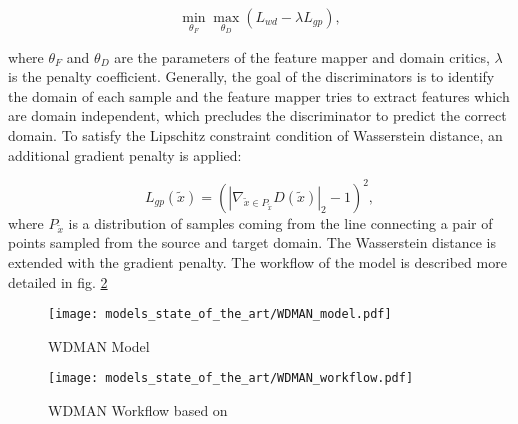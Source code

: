 \begin{equation}
    \min_{\theta_{F}} \max_{\theta_{D}} (L_{wd} - \lambda L_{gp}), 
\end{equation}

where $\theta_{F}$ and $\theta_{D}$ are the parameters of the feature mapper and domain critics, $\lambda$ is the penalty coefficient. Generally, the goal of the discriminators is to identify the domain of each sample and the feature mapper tries to extract features which are domain independent, which precludes the discriminator to predict the correct domain. To satisfy the Lipschitz constraint condition of Wasserstein distance, an additional gradient penalty is applied: 

\begin{equation}
     L_{gp}(\tilde{x}) = (|\nabla_{\tilde{x} \in P_{\tilde{x}}} D(\tilde{x})|_{2}-1)^{2}, 
\end{equation}
where $P_{\tilde{x}}$ is a distribution of samples coming from the line connecting a pair of points sampled from the source and target domain. The Wasserstein distance is extended with the gradient penalty. The workflow of the model is described more detailed in fig. \ref{fig:WDMAN_workflow}
 \begin{figure}[H]
  \centering
  \texttt{[image: models\_state\_of\_the\_art/WDMAN\_model.pdf]}
  \caption{WDMAN Model \cite{Zhang2019}}
  \label{fig:WDMAN_model}
\end{figure}
 
\begin{figure}[H]
  \centering
  \texttt{[image: models\_state\_of\_the\_art/WDMAN\_workflow.pdf]}
  \caption{WDMAN Workflow based on \cite{Zhang2019}}
  \label{fig:WDMAN_workflow}
\end{figure}
 
 
